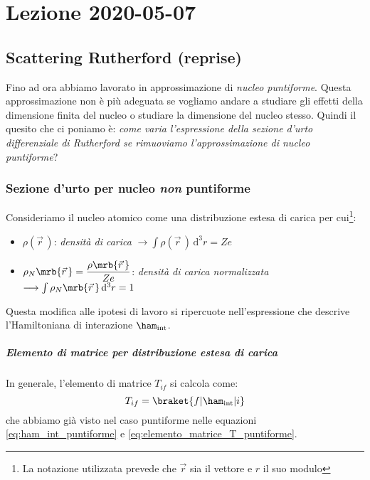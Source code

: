 \chapter{Lezione 2020-05-07}
\section{Scattering Rutherford (reprise)}
Fino ad ora abbiamo lavorato in approssimazione di \textit{nucleo puntiforme}.
Questa approssimazione non è più adeguata se vogliamo andare a studiare gli
effetti della dimensione finita del nucleo o studiare la dimensione del nucleo
stesso. Quindi il quesito che ci poniamo è: \textit{come varia l'espressione
	della sezione d'urto differenziale di Rutherford se rimuoviamo
	l'approssimazione di nucleo puntiforme}?

\subsection{Sezione d'urto per nucleo \textit{non} puntiforme}
Consideriamo il nucleo atomico come una distribuzione estesa di carica per
cui\footnote{
	La notazione utilizzata prevede che $\vec{r}$ sia il vettore e $r$ il suo
	modulo
}:
\begin{itemize}
	\item $\rho(\vec{r}\,)$: \textit{densità di carica} $\longrightarrow \int
		      \rho(\vec{r}\,) \, \mathrm{d}^3r = Ze$
	\item $\rho_N \mrb{\vec{r}\,} = \dfrac{\rho\mrb{\vec{r}\,}}{Ze}$:
	      \textit{densità di carica normalizzata} $\longrightarrow \int
		      \rho_N\mrb{\vec{r}\,} \, \mathrm{d}^3r = 1$
\end{itemize}
Questa modifica alle ipotesi di lavoro si ripercuote nell'espressione che
descrive l'Hamiltoniana di interazione $\ham_\text{int}$.

\paragraph{Elemento di matrice per distribuzione estesa di carica}
In generale, l'elemento di matrice $T_{if}$ si calcola come:
\begin{equation}
	T_{if} = \braket{f \vert \ham_\text{int} \vert i}
\end{equation}
che abbiamo già visto nel caso puntiforme nelle equazioni
\ref{eq:ham_int_puntiforme} e \ref{eq:elemento_matrice_T_puntiforme}.

